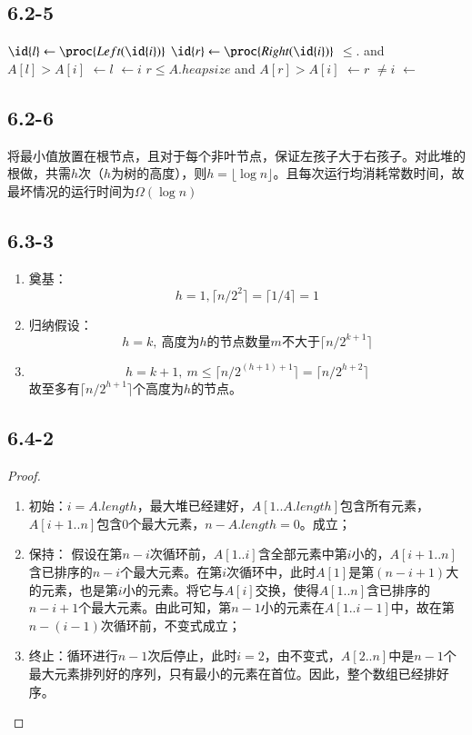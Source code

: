 \documentclass[twocolumn]{article}
\begin{document}
	\subsection*{6.2-5}
	\begin{codebox}
		\zi{}\li 
		\While {}\Do\li 
		$\id{l}\gets \proc{Left(\id{i})}$\li 
		$\id{r}\gets \proc{Right(\id{i})}$\li 
		\If {}$\le $. and $A[l]>A[i]$ \Then\li 
		$\gets l$\li 
		\Else\li 
		$\gets i$\End\li 
		\If $r\le A.heapsize$ and $A[r]>A[i]$\Then\li 
		$\gets r$\End\li 
		\If {}$\neq i$\Then\li 
		\li 
		$\gets$\End
	\end{codebox}
	\subsection*{6.2-6}
	将最小值放置在根节点，且对于每个非叶节点，保证左孩子大于右孩子。对此堆的根做，共需$h$次（$h$为树的高度），则$h=\lfloor \log n\rfloor$。且每次运行均消耗常数时间，故最坏情况的运行时间为$\Omega(\log n)$
	\subsection*{6.3-3}
	\begin{enumerate}[(1)]
		\item 奠基：
		$$h=1,\lceil n/2^2\rceil=\lceil 1/4\rceil=1$$
		\item 归纳假设：
		$$h=k,\ \text{高度为$h$的节点数量$m$不大于}\lceil n/2^{k+1}\rceil$$
		\item $$h=k+1,\ m\le \lceil n/2^{(h+1)+1}\rceil=\lceil n/2^{h+2}\rceil$$
		故至多有$\lceil n/2^{h+1}\rceil$个高度为$h$的节点。
	\end{enumerate}
	\subsection*{6.4-2}
	\begin{proof}
	\begin{enumerate}[(1)]
		\item 初始：$i=A.length$，最大堆已经建好，$A[1..A.length]$包含所有元素，$A[i+1..n]$包含$0$个最大元素，$n-A.length=0$。成立；
		\item 保持： 假设在第$n-i$次循环前，$A[1..i]$含全部元素中第$i$小的，$A[i+1..n]$含已排序的$n-i$个最大元素。在第$i$次循环中，此时$A[1]$是第$(n-i+1)$大的元素，也是第$i$小的元素。将它与$A[i]$交换，使得$A[1..n]$含已排序的$n-i+1$个最大元素。由此可知，第$n-1$小的元素在$A[1..i-1]$中，故在第$n-(i-1)$次循环前，不变式成立；
		\item 终止：循环进行$n-1$次后停止，此时$i=2$，由不变式，$A[2..n]$中是$n-1$个最大元素排列好的序列，只有最小的元素在首位。因此，整个数组已经排好序。
	\end{enumerate}
	\end{proof}
\end{document}
